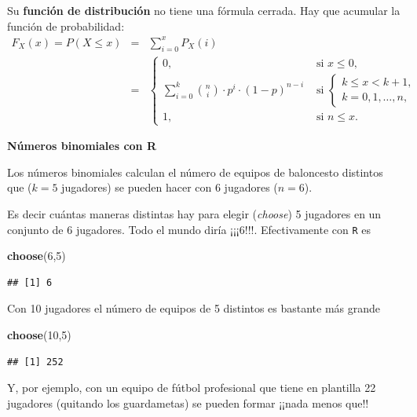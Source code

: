 \documentclass[]{book}
\newenvironment{Shaded}{\begin{snugshade}}{\end{snugshade}}
\newcommand{\DecValTok}[1]{\textcolor[rgb]{0.00,0.00,0.81}{#1}}
\newcommand{\KeywordTok}[1]{\textcolor[rgb]{0.13,0.29,0.53}{\textbf{#1}}}
\newcommand{\NormalTok}[1]{#1}
\begin{document}
Su \textbf{función de distribución} no tiene una fórmula cerrada. Hay que acumular la función de probabilidad:
\begin{eqnarray*}
F_{X}(x)=P(X\leq x) & = & \sum_{i=0}^x P_X(i)\\
& = & 
\left\{
\begin{array}{ll}
0, & \mbox{ si } x\leq 0,\\\displaystyle
\sum_{i=0}^k {n\choose i}\cdot  p^i \cdot (1-p)^{n-i} & \mbox{ si } 
\left\{
  \begin{array}{l} 
  k\leq x< k+1,\\
  k=0,1,\ldots,n,
  \end{array}
\right.\\
1, & \mbox{ si } n\leq x.
\end{array}
\right.
\end{eqnarray*}

\textbf{Números binomiales con R}

Los números binomiales calculan el número de equipos de baloncesto distintos que (\(k=5\) jugadores) se pueden hacer con 6 jugadores (\(n=6\)).

Es decir cuántas maneras distintas hay para elegir (\emph{choose}) 5 jugadores en un conjunto de 6 jugadores. Todo el mundo diría
¡¡¡6!!!. Efectivamente con \texttt{R} es

\begin{Shaded}
\begin{Highlighting}[]
\KeywordTok{choose}\NormalTok{(}\DecValTok{6}\NormalTok{,}\DecValTok{5}\NormalTok{)}
\end{Highlighting}
\end{Shaded}

\begin{verbatim}
## [1] 6
\end{verbatim}

Con 10 jugadores el número de equipos de 5 distintos es bastante más grande

\begin{Shaded}
\begin{Highlighting}[]
\KeywordTok{choose}\NormalTok{(}\DecValTok{10}\NormalTok{,}\DecValTok{5}\NormalTok{)}
\end{Highlighting}
\end{Shaded}

\begin{verbatim}
## [1] 252
\end{verbatim}

Y, por ejemplo, con un equipo de fútbol profesional que tiene en plantilla 22 jugadores (quitando los guardametas) se pueden formar ¡¡nada menos que!!
\end{document}
